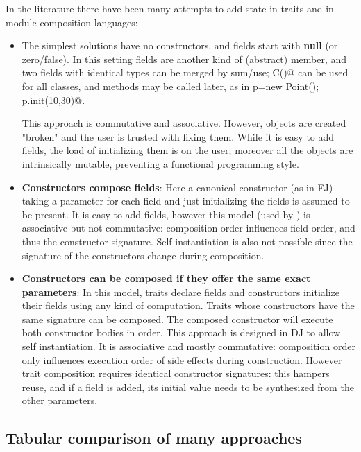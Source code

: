 In the literature there have been many attempts to add state in traits and in module composition languages:
\begin{itemize}  
\item The simplest solutions have no constructors, and fields start with {\bf null} (or zero/false).
In this setting fields are another kind of (abstract) member, and two fields with identical types can be merged by sum/use; \Q@new C()@ can be used for all classes, and \Q@init@ methods may be called later, as in
  \Q@Point p=new Point(); p.init(10,30)@.
  
This approach is commutative and associative.
  However, objects are created "broken" and the user is trusted with fixing them.
  While it is easy to add fields, the load of initializing them is on the user; moreover
    all the objects are intrinsically mutable, preventing a functional programming style.
\item {\bf Constructors compose fields}:
Here a canonical constructor (as in FJ) taking a parameter for each field and just initializing the fields is assumed to be present.
It is easy to add fields, however this model (used by \cite{fjig}) is associative but not commutative: composition order influences field order, and thus the constructor signature.
Self instantiation is also not possible 
since the signature of the constructors change during composition.


\item {\bf Constructors can be composed if they offer the same exact parameters}:
In this model, traits declare fields and constructors initialize their fields using any kind of computation.
Traits whose constructors have the same signature can be composed.
The composed constructor will execute both constructor bodies in order.
This approach is designed in DJ to allow self instantiation.
It is associative and mostly commutative: composition order only influences execution order of side effects during construction.
However trait composition requires identical constructor signatures: this
hampers reuse, and if a field is added, its initial value needs to be
synthesized from the other parameters.
\end{itemize}
\saveSpace\saveSpace
\subsection{Tabular comparison of many approaches}
\saveSpace


